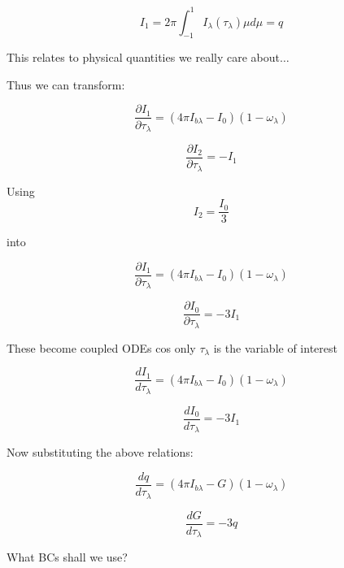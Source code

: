 \documentclass[12pt]{article}
\renewcommand{\_}{\kern-1.5pt\textunderscore\kern-1.5pt}
\begin{document}
\begin{itemize}
 \[ I_{1}=2 \pi  \int _{-1}^{1}I_{ \lambda } \left(  \tau_{ \lambda } \right)  \mu  d \mu =q \] \par

This relates to physical quantities we really care about$ \ldots $ \par


\vspace{\baselineskip}
Thus we can transform:\par

 \[ \frac{ \partial I_{1}}{ \partial  \tau_{ \lambda }}= \left( 4 \pi I_{b \lambda }-I_{0} \right)  \left( 1- \omega _{ \lambda } \right)  \] \par

 \[ \frac{ \partial I_{2}}{ \partial  \tau_{ \lambda }}=-I_{1} \] \par

Using  \(  \)  \[ I_{2}=\frac{I_{0}}{3} \] \par

into\par

 \[ \frac{ \partial I_{1}}{ \partial  \tau_{ \lambda }}= \left( 4 \pi I_{b \lambda }-I_{0} \right)  \left( 1- \omega _{ \lambda } \right)  \] \par

 \[ \frac{ \partial I_{0}}{ \partial  \tau_{ \lambda }}=-3I_{1} \] \par

These become coupled ODEs cos only  \(  \tau_{ \lambda } \)  is the variable of interest\par

 \[ \frac{dI_{1}}{d \tau_{ \lambda }}= \left( 4 \pi I_{b \lambda }-I_{0} \right)  \left( 1- \omega _{ \lambda } \right)  \] \par

 \[ \frac{dI_{0}}{d \tau_{ \lambda }}=-3I_{1} \] \par

Now substituting the above relations:\par

 \[ \frac{dq}{d \tau_{ \lambda }}= \left( 4 \pi I_{b \lambda }-G \right)  \left( 1- \omega _{ \lambda } \right)  \] \par

 \[ \frac{dG}{d \tau_{ \lambda }}=-3q \] \par


\vspace{\baselineskip}
What BCs shall we use?\par


\end{itemize}
\end{document}
